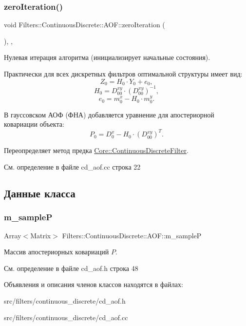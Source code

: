 \subsubsection{\texorpdfstring{zero\+Iteration()}{zeroIteration()}}
{\footnotesize\ttfamily void Filters\+::\+Continuous\+Discrete\+::\+A\+O\+F\+::zero\+Iteration (\begin{DoxyParamCaption}{ }\end{DoxyParamCaption})\hspace{0.3cm}{\ttfamily [override]}, {\ttfamily [protected]}, {\ttfamily [virtual]}}



Нулевая итерация алгоритма (инициализирует начальные состояния). 

Практически для всех дискретных фильтров оптимальной структуры имеет вид\+: \[Z_0 = H_0 \cdot Y_0 + e_0,\] \[H_0 = D_{00}^{xy} \cdot (D_{00}^{xy})^{-1},\] \[e_0 = m_0^x - H_0 \cdot m_0^y.\]

В гауссовском АОФ (ФНА) добавляется уравнение для апостериорной ковариации объекта\+: \[P_0 = D_0^x - H_0 \cdot (D_{00}^{xy})^T.\] 

Переопределяет метод предка \hyperlink{class_core_1_1_continuous_discrete_filter_acc9b18241a13d46dc92ef1f02ec13e53}{Core\+::\+Continuous\+Discrete\+Filter}.



См. определение в файле cd\+\_\+aof.\+cc строка 22



\subsection{Данные класса}
\hypertarget{class_filters_1_1_continuous_discrete_1_1_a_o_f_a31111852e94dab62675d8692a4c22df1}{}\label{class_filters_1_1_continuous_discrete_1_1_a_o_f_a31111852e94dab62675d8692a4c22df1} 
\subsubsection{\texorpdfstring{m\+\_\+sampleP}{m\_sampleP}}
{\footnotesize\ttfamily Array$<$Matrix$>$ Filters\+::\+Continuous\+Discrete\+::\+A\+O\+F\+::m\+\_\+sampleP\hspace{0.3cm}{\ttfamily [protected]}}

Массив апостериорных ковариаций $P$. 

См. определение в файле cd\+\_\+aof.\+h строка 48



Объявления и описания членов классов находятся в файлах\+:\begin{DoxyCompactItemize}
\item 
src/filters/continuous\+\_\+discrete/cd\+\_\+aof.\+h\item 
src/filters/continuous\+\_\+discrete/cd\+\_\+aof.\+cc\end{DoxyCompactItemize}
